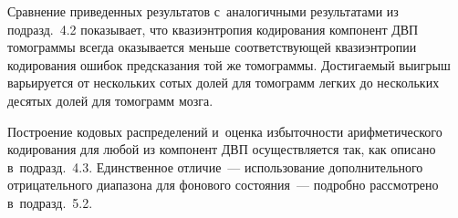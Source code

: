 \begin{multicols}{2}
Сравнение приведенных результатов с~аналогичными результатами 
из подразд.~4.2 показывает, что квазиэнтропия кодирования компонент 
ДВП томограммы всегда оказывается меньше соответствующей квазиэнтропии 
кодирования ошибок предсказания той же томограммы. Достигаемый выигрыш 
варьируется от нескольких сотых долей для томограмм легких до нескольких 
десятых долей для томограмм мозга.

Построение кодовых распределений и~оценка избыточности арифметического 
кодирования для любой из компонент ДВП осуществляется так, как описано 
в~подразд.~4.3. Единственное отличие~--- использование дополнительного 
отрицательного диапазона для фонового состояния~--- подробно рассмотрено 
в~подразд.~5.2.



\setcounter{table}{8}

\begin{table*}[b]\small
\vspace*{-9pt}
\begin{center}
\label{tab9}
\vspace{2ex}


\end{center}
\end{table*}
\end{multicols}
